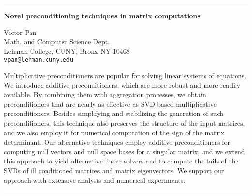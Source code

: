 \documentclass[twosided]{report}
\begin{document}
	\begin{center} \rule{6in}{1pt} \end{center}

\begin{center}
{\large			%
{\bf Novel preconditioning techniques in matrix computations}}

	Victor Pan \\
	Math. and Computer Science Dept. \\
	Lehman College, CUNY, Bronx NY 10468 \\
	{\tt vpan@lehman.cuny.edu}
\end{center}
Multiplicative preconditioners are popular for solving
linear systems of equations. We introduce additive
preconditioners, which are more robust and more readily
available. By combining them with aggregation processes, we
obtain preconditioners that are nearly as effective as
SVD-based multiplicative preconditioners. Besides
simplifying and stabilizing the generation of such
preconditioners, this technique also preserves the structure
of the input matrices, and we also employ it for numerical
computation of the sign of the matrix determinant. Our
alternative techniques employ additive preconditioners for
computing null vectors and null space bases for a singular
matrix, and we extend this approach to yield alternative
linear solvers and to compute the tails of the SVDs of ill
conditioned matrices and matrix eigenvectors. We support our
approach with extensive analysis and numerical experiments.



	\begin{center} \rule{6in}{1pt} \end{center}

\newpage
\end{document}

